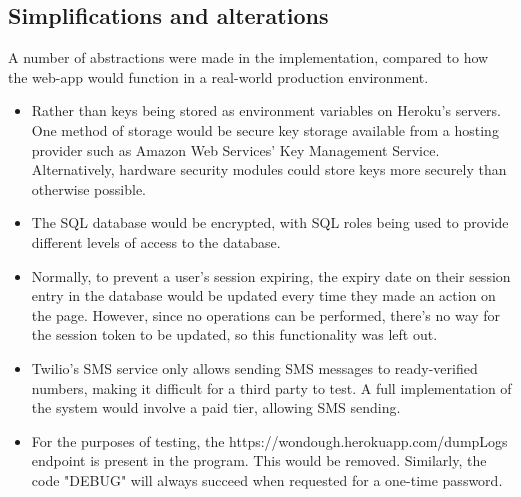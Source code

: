 \subsection{Simplifications and alterations}

A number of abstractions were made in the implementation, compared to how the web-app would function in a real-world production environment. 

\begin{itemize}

    \item Rather than keys being stored as environment variables on Heroku's servers. One method of storage would be secure key storage available from a hosting provider such as Amazon Web Services' Key Management Service. Alternatively, hardware security modules could store keys more securely than otherwise possible.

    \item The SQL database would be encrypted, with SQL roles being used to provide different levels of access to the database.

    \item Normally, to prevent a user's session expiring, the expiry date on their session entry in the database would be updated every time they made an action on the page. However, since no operations can be performed, there's no way for the session token to be updated, so this functionality was left out.

    \item Twilio's SMS service only allows sending SMS messages to ready-verified numbers, making it difficult for a third party to test. A full implementation of the system would involve a paid tier, allowing SMS sending.

    \item For the purposes of testing, the {https://wondough.herokuapp.com/dumpLogs} endpoint is present in the program. This would be removed. Similarly, the code "DEBUG" will always succeed when requested for a one-time password. 

\end{itemize}